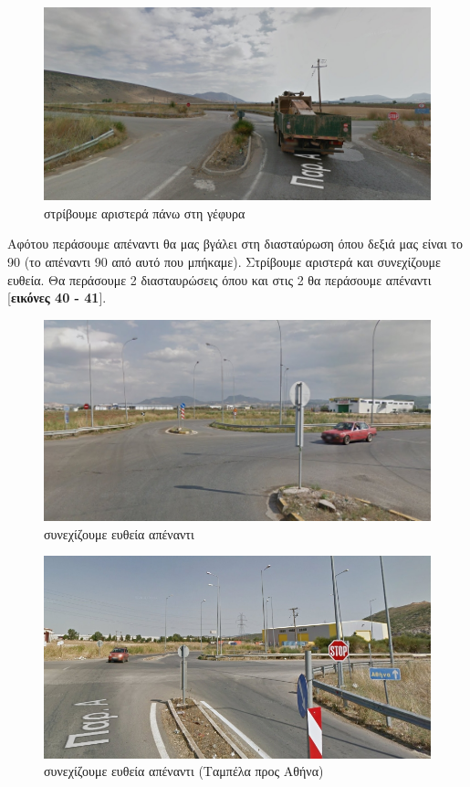 \begin{figure}[H]
\includegraphics[width=\textwidth]{images/lamia-athina/thiva/thiva_015.jpg} 
\caption{στρίβουμε αριστερά πάνω στη γέφυρα}
\end{figure}
Αφότου περάσουμε απέναντι θα μας βγάλει στη διασταύρωση όπου δεξιά μας είναι το 90 (το απέναντι 90 από αυτό που μπήκαμε). Στρίβουμε αριστερά και συνεχίζουμε ευθεία. Θα περάσουμε 2 διασταυρώσεις όπου και στις 2 θα περάσουμε απέναντι [\textbf{εικόνες 40 - 41}].
\begin{figure}[H]
\includegraphics[width=\textwidth]{images/lamia-athina/thiva/thiva_016.jpg} 
\caption{συνεχίζουμε ευθεία απέναντι}
\end{figure}
\begin{figure}[H]
\includegraphics[width=\textwidth]{images/lamia-athina/thiva/thiva_017.jpg} 
\caption{συνεχίζουμε ευθεία απέναντι (Ταμπέλα προς Αθήνα)}
\end{figure}

